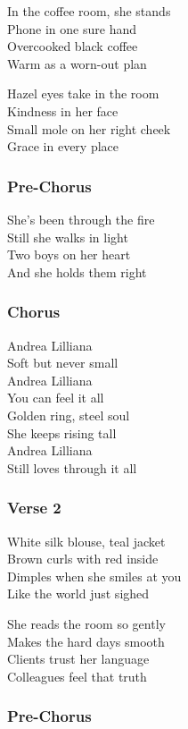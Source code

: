 \documentclass[]{article}
\begin{document}
In the coffee room, she stands\\
Phone in one sure hand\\
Overcooked black coffee\\
Warm as a worn-out plan

Hazel eyes take in the room\\
Kindness in her face\\
Small mole on her right cheek\\
Grace in every place

\subsubsection{Pre-Chorus}\label{pre-chorus-12}

She's been through the fire\\
Still she walks in light\\
Two boys on her heart\\
And she holds them right

\subsubsection{Chorus}\label{chorus-22}

Andrea Lilliana\\
Soft but never small\\
Andrea Lilliana\\
You can feel it all\\
Golden ring, steel soul\\
She keeps rising tall\\
Andrea Lilliana\\
Still loves through it all

\subsubsection{Verse 2}\label{verse-2-6}

White silk blouse, teal jacket\\
Brown curls with red inside\\
Dimples when she smiles at you\\
Like the world just sighed

She reads the room so gently\\
Makes the hard days smooth\\
Clients trust her language\\
Colleagues feel that truth

\subsubsection{Pre-Chorus}\label{pre-chorus-13}
\end{document}
